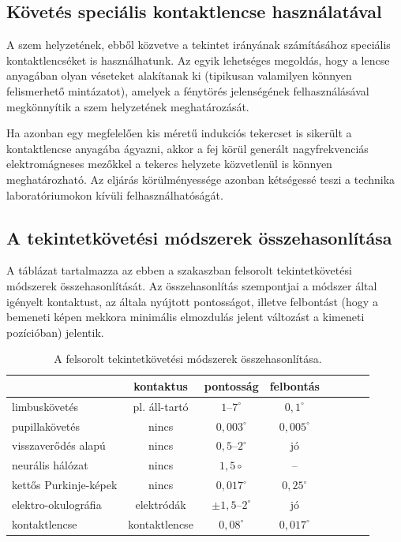 \subsection{Követés speciális kontaktlencse használatával}\label{sect:kontakt}

A szem helyzetének, ebből közvetve a tekintet irányának számításához speciális kontaktlencséket is használhatunk. Az egyik lehetséges megoldás, hogy a lencse anyagában olyan véseteket alakítanak ki (tipikusan valamilyen könnyen felismerhető mintázatot), amelyek a fénytörés jelenségének felhasználásával megkönnyítik a szem helyzetének meghatározását.

Ha azonban egy megfelelően kis méretű indukciós tekercset is sikerült a kontaktlencse anyagába ágyazni, akkor a fej körül generált nagyfrekvenciás elektromágneses mezőkkel a tekercs helyzete közvetlenül is könnyen meghatározható. Az eljárás körülményessége azonban kétségessé teszi a technika laboratóriumokon kívüli felhasználhatóságát.


\subsection{A tekintetkövetési módszerek összehasonlítása}\label{sect:tekintet_osszehas}

A  táblázat tartalmazza az ebben a szakaszban felsorolt tekintetkövetési módszerek összehasonlítását. Az összehasonlítás szempontjai a módszer által igényelt kontaktust, az általa nyújtott pontosságot, illetve felbontást (hogy a bemeneti képen mekkora minimális elmozdulás jelent változást a kimeneti pozícióban) jelentik. 

\begin{table}[ht]
	\centering
	\caption{A felsorolt tekintetkövetési módszerek összehasonlítása.} \label{tab:osszehas}
	\begin{tabular}{ l || c | c | c | c | c | c | c }
	 & kontaktus & pontosság & felbontás \\ \hline \hline
	limbuskövetés & pl. áll-tartó & $1$--$7^\circ$ & $0,\!1^\circ$ \\
	pupillakövetés & nincs & $0,\!003^\circ$ & $0,\!005^\circ$ \\
	visszaverődés alapú & nincs & $0,\!5$--$2^\circ$ & jó \\
	neurális hálózat & nincs & $1,\!5\circ$ & -- \\
	kettős Purkinje-képek & nincs & $0,\!017^\circ$ & $0,\!25^\circ$ \\ 
	elektro-okulográfia & elektródák & $\pm1,\!5$--$2^\circ$ & jó \\
	kontaktlencse & kontaktlencse & $0,\!08^\circ$ & $0,\!017^\circ$ \\
	\end{tabular}
\end{table}

